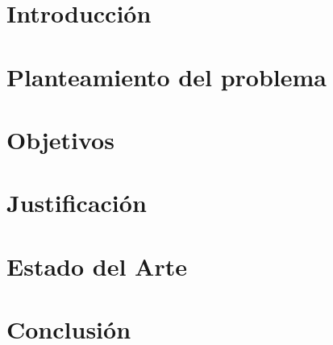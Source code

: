 \section{Introducción}



\section{Planteamiento del problema}


\section{Objetivos}


\section{Justificación}



\section{Estado del Arte}


\section{Conclusión}
